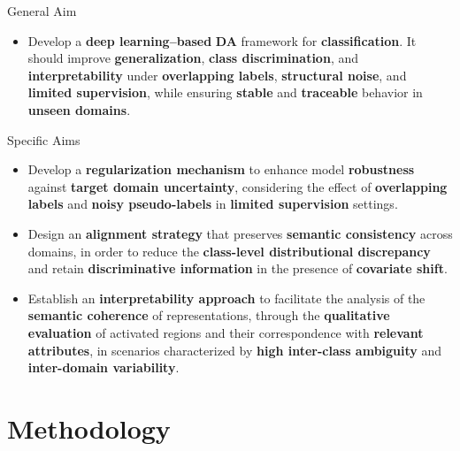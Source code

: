 \documentclass[aspectratio=169]{beamer}
\begin{document}
\begin{frame}{General Aim}

   \begin{itemize}
\justifying
   \item Develop a \textbf{deep learning–based} \textbf{DA} framework for \textbf{classification}. It should improve \textbf{generalization}, \textbf{class discrimination}, and \textbf{interpretability} under \textbf{overlapping labels}, \textbf{structural noise}, and \textbf{limited supervision}, while ensuring \textbf{stable} and \textbf{traceable} behavior in \textbf{unseen domains}.

   \end{itemize}
\end{frame}



\begin{frame}{Specific Aims}
   \begin{itemize}
    \setlength\itemsep{2em}
\justifying
     \item[1] Develop a \textbf{regularization mechanism} to enhance model \textbf{robustness} against \textbf{target domain uncertainty}, considering the effect of \textbf{overlapping labels} and \textbf{noisy pseudo-labels} in \textbf{limited supervision} settings.
     
     \item[2] Design an \textbf{alignment strategy} that preserves \textbf{semantic consistency} across domains, in order to reduce the \textbf{class-level distributional discrepancy} and retain \textbf{discriminative information} in the presence of \textbf{covariate shift}.
     
     \item[3] Establish an \textbf{interpretability approach} to facilitate the analysis of the \textbf{semantic coherence} of representations, through the \textbf{qualitative evaluation} of activated regions and their correspondence with \textbf{relevant attributes}, in scenarios characterized by \textbf{high inter-class ambiguity} and \textbf{inter-domain variability}.
    
   \end{itemize}   
\end{frame}

\section{Methodology}
\end{document}
